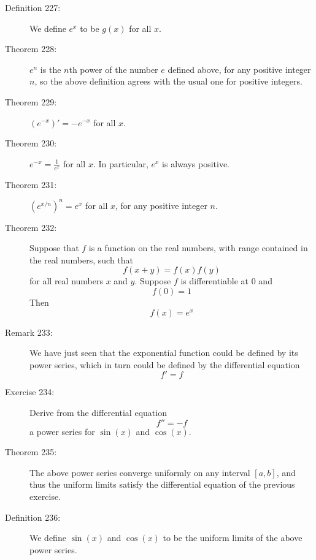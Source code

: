 \documentclass{article}
\begin{document}
\begin{description}
  \item[Definition 227:] We define $e^{x}$ to be $g(x)$ for all $x$.

  \item[Theorem 228:] $e^{n}$ is the $n$th power of the number $e$ defined above, for any positive integer $n$, so the above definition agrees with the usual one for positive integers. 

  \item[Theorem 229:] $(e^{-x})' = -e^{-x}$ for all $x$.

  \item[Theorem 230:] $e^{-x} = \frac{1}{e^{x}}$ for all $x$. In particular, $e^{x}$ is always positive. 

  \item[Theorem 231:] $(e^{x/n})^{n} = e^{x}$ for all $x$, for any positive integer $n$. 

  \item[Theorem 232:] Suppose that $f$ is a function on the real numbers, with range contained in the real numbers, such that
    \begin{equation*}
    f(x+y) = f(x) f(y)
    \end{equation*}
    for all real numbers $x$ and $y$. Suppose $f$ is differentiable at $0$ and
    \begin{equation*}
    f(0) =1
    \end{equation*}
    Then
    \begin{equation*}
    f(x) =e^{x}
    \end{equation*}

  \item[Remark 233:] We have just seen that the exponential function could be defined by its power series, which in turn could be defined by the differential equation
    \begin{equation*}
    f' = f
    \end{equation*}

  \item[Exercise 234:] Derive from the differential equation
    \begin{equation*}
    f'' = -f
    \end{equation*}
    a power series for $\sin (x)$ and $\cos (x)$. 

  \item[Theorem 235:] The above power series converge uniformly on any interval $[a,b]$, and thus the uniform limits satisfy the differential equation of the previous exercise. 

  \item[Definition 236:] We define $\sin (x)$ and $\cos (x)$ to be the uniform limits of the above power series.


\end{description}
\end{document}
